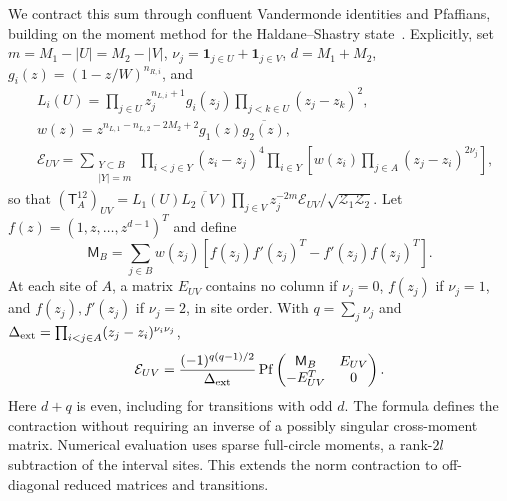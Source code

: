 \documentclass[11pt]{article}
\begin{document}
We contract this sum through confluent Vandermonde identities
and Pfaffians, building on the moment method for the
Haldane--Shastry state~\cite{numStephan}. Explicitly, set
$m=M_1-|U|=M_2-|V|$, $\nu_j=\mathbf1_{j\in U}+\mathbf1_{j\in V}$,
$d=M_1+M_2$, $g_i(z)=(1-z/W)^{n_{R,i}}$, and
\begin{equation}
    \begin{aligned}
       &L_i(U)=\prod_{j\in U}z_j^{n_{L,i}+1}g_i(z_j)
                  \prod_{j<k\in U}(z_j-z_k)^2,\nonumber\\
 &w(z)=z^{n_{L,1}-n_{L,2}-2M_2+2}g_1(z)\overline{g_2(z)},\nonumber\\
 &\mathcal E_{UV}=\sum_{\substack{Y\subset B\\|Y|=m}}
       \prod_{i<j\in Y}(z_i-z_j)^4
       \prod_{i\in Y}\left[w(z_i)\prod_{j\in A}(z_j-z_i)^{2\nu_j}\right],
    \end{aligned}
     \label{eq:num-environment} 
\end{equation}
so that $(\mathsf T_A^{12})_{UV}=L_1(U)\overline{L_2(V)}
\prod_{j\in V}z_j^{-2m}\mathcal E_{UV}/\sqrt{\mathcal Z_1\mathcal Z_2}$.
Let $f(z)=(1,z,\ldots,z^{d-1})^T$ and define
\begin{equation}
 \mathsf M_B=\sum_{j\in B}w(z_j)
 [f(z_j)f'(z_j)^T-f'(z_j)f(z_j)^T].
 \label{eq:num-moment}
\end{equation}
At each site of $A$, a matrix $E_{UV}$ contains no column if
$\nu_j=0$, $f(z_j)$ if $\nu_j=1$, and $f(z_j),f'(z_j)$ if
$\nu_j=2$, in site order. With $q=\sum_j\nu_j$ and
$\Delta_{\rm ext}=\prod_{i<j\in A}(z_j-z_i)^{\nu_i\nu_j}$,
\begin{equation}
 \mathcal E_{UV}=\frac{(-1)^{q(q-1)/2}}{\Delta_{\rm ext}}
   \operatorname{Pf}\begin{pmatrix}\mathsf M_B&E_{UV}\\-E_{UV}^T&0\end{pmatrix}.
 \label{eq:num-bordered-pf}
\end{equation}
Here $d+q$ is even, including for transitions with odd $d$.
The formula defines the contraction without requiring an
inverse of a possibly singular cross-moment matrix. Numerical evaluation uses sparse full-circle moments, a rank-$2l$
subtraction of the interval sites. This extends the norm contraction to off-diagonal reduced matrices and transitions.

\end{document}

